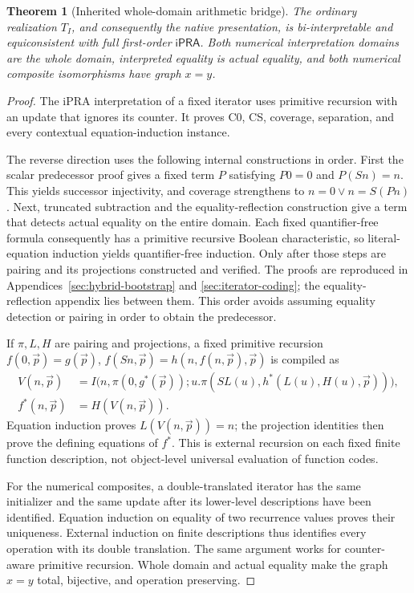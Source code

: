 \documentclass[11pt]{article}
\newtheorem{theorem}{Theorem}[section]
\theoremstyle{definition}\newtheorem{definition}[theorem]{Definition}
\theoremstyle{remark}\newtheorem{remark}[theorem]{Remark}
\newcommand{\ipra}{\mathsf{iPRA}}
\begin{document}
\begin{theorem}[Inherited whole-domain arithmetic bridge]
\label{main:biinterpretation}
The ordinary realization \(T_I\), and consequently the native presentation,
is bi-interpretable and equiconsistent with full first-order \(\ipra\).
Both numerical interpretation domains are the whole domain, interpreted
equality is actual equality, and both numerical composite isomorphisms have
graph \(x=y\).
\end{theorem}
\begin{proof}
The iPRA interpretation of a fixed iterator uses primitive recursion with
an update that ignores its counter. It proves C0, CS, coverage, separation,
and every contextual equation-induction instance.

The reverse direction uses the following internal constructions in order.
First the scalar predecessor proof gives a fixed term \(P\) satisfying
\(P0=0\) and \(P(Sn)=n\). This yields successor injectivity, and coverage
strengthens to \(n=0\vee n=S(Pn)\). Next, truncated subtraction and the
equality-reflection construction give a term that detects actual equality
on the entire domain. Each fixed quantifier-free formula consequently has
a primitive recursive Boolean characteristic, so literal-equation
induction yields quantifier-free induction. Only after those steps are
pairing and its projections constructed and verified. The proofs are
reproduced in Appendices~\ref{sec:hybrid-bootstrap} and
\ref{sec:iterator-coding}; the equality-reflection appendix lies between
them. This order avoids assuming equality detection or pairing in order
to obtain the predecessor.

If \(\pi,L,H\) are pairing and projections, a fixed primitive recursion
\(f(0,\vec p)=g(\vec p)\), \(f(Sn,\vec p)=h(n,f(n,\vec p),\vec p)\)
is compiled as
\begin{align*}
 V(n,\vec p)&=I\bigl(n,\pi(0,g^*(\vec p));
 u.\pi(SL(u),h^*(L(u),H(u),\vec p))\bigr),\\
 f^*(n,\vec p)&=H(V(n,\vec p)).
\end{align*}
Equation induction proves \(L(V(n,\vec p))=n\); the projection identities
then prove the defining equations of \(f^*\). This is external recursion
on each fixed finite function description, not object-level universal
evaluation of function codes.

For the numerical composites, a double-translated iterator has the same
initializer and the same update after its lower-level descriptions have
been identified. Equation induction on equality of two recurrence values
proves their uniqueness. External induction on finite descriptions thus
identifies every operation with its double translation. The same argument
works for counter-aware primitive recursion. Whole domain and actual
equality make the graph \(x=y\) total, bijective, and operation preserving.


\end{proof}
\end{document}
